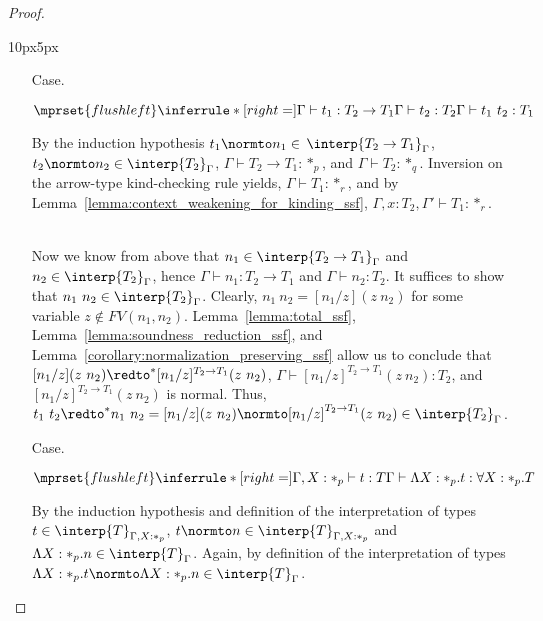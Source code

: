 \begin{proof}
\begin{changemargin}{10px}{5px}
\begin{itemize}
\item[Case.]\ \\
  \begin{center}
    \begin{math}
      $$\mprset{flushleft}
      \inferrule* [right=] {
        \Gamma \vdash t_1 : T_2 \rightarrow T_1 
        \\
        \Gamma \vdash t_2 : T_2
      }{\Gamma \vdash t_1\ t_2 : T_1}
    \end{math}
  \end{center}
  By the induction hypothesis $t_1 \normto n_1 \in $
  $\interp{T_2 \rightarrow T_1}_\Gamma$,
  $t_2 \normto n_2 \in \interp{T_2}_\Gamma$, $\Gamma \vdash T_2 \rightarrow T_1:*_p$, 
  and $\Gamma \vdash T_2:*_q$.  Inversion on the arrow-type kind-checking rule yields, 
  $\Gamma \vdash T_1:*_r$, and by
  Lemma~\ref{lemma:context_weakening_for_kinding_ssf}, 
  $\Gamma,x:T_2,\Gamma' \vdash T_1:*_r$.

  \ \\
  Now we know from above that $n_1 \in \interp{T_2 \rightarrow T_1}_\Gamma$ and
  $n_2 \in \interp{T_2}_\Gamma$, hence $\Gamma \vdash n_1:T_2 \to T_1$ and
  $\Gamma \vdash n_2:T_2$.  It suffices to show that $n_1\ n_2 \in \interp{T_2}_\Gamma$.
  Clearly, $n_1\ n_2 = [n_1/z](z\ n_2)$ for some variable $z \not \in FV(n_1,n_2)$.  
  Lemma~\ref{lemma:total_ssf}, Lemma~\ref{lemma:soundness_reduction_ssf}, 
  and Lemma~\ref{corollary:normalization_preserving_ssf} allow us to conclude that 
  $[n_1/z](z\ n_2) \redto^* [n_1/z]^{T_2 \to T_1}(z\ n_2)$, $\Gamma \vdash [n_1/z]^{T_2 \to T_1}(z\ n_2):T_2$,
  and $[n_1/z]^{T_2 \to T_1}(z\ n_2)$ is normal.  Thus, 
  $t_1\ t_2 \redto^* n_1\ n_2 = [n_1/z](z\ n_2) \normto [n_1/z]^{T_2 \to T_1}(z\ n_2) \in \interp{T_2}_\Gamma$.
  
\item[Case.]\ \\
  \begin{center}
    \begin{math}
      $$\mprset{flushleft}
      \inferrule* [right=] {
        \Gamma, X : *_p \vdash t : T
      }{\Gamma \vdash \Lambda X:*_p.t:\forall X:*_p.T}
    \end{math}
  \end{center}
  By the induction hypothesis and definition of the interpretation of types 
  $t \in \interp{T}_{\Gamma,X:*_p}$, $t \normto n \in \interp{T}_{\Gamma,X:*_p}$ and 
  $\Lambda X:*_p.n \in \interp{T}_{\Gamma}$.  Again, by definition of the interpretation 
  of types $\Lambda X:*_p.t \normto \Lambda X:*_p.n \in \interp{T}_{\Gamma}$.


\end{itemize}
\end{changemargin}
\end{proof}
